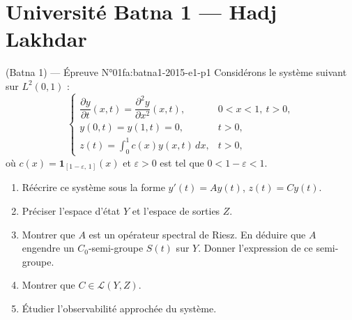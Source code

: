 \section{Université Batna 1 --- Hadj Lakhdar}
\begin{problem}{(Batna 1) — Épreuve N°01}{fa:batna1-2015-e1-p1}
Considérons le système suivant sur $L^2(0,1)$ :
$$\begin{cases}\dfrac{\partial y}{\partial t}(x,t)=\dfrac{\partial^2y}{\partial x^2}(x,t), & 0<x<1,\ t>0,\\[1ex] y(0,t)=y(1,t)=0, & t>0,\\[1ex] z(t)=\displaystyle\int_0^1c(x)y(x,t)\,dx, & t>0,\end{cases}$$
où $c(x)=\mathbf{1}_{[1-\varepsilon,\,1]}(x)$ et $\varepsilon>0$ est tel que $0<1-\varepsilon<1$.
\begin{enumerate}\item Réécrire ce système sous la forme $y'(t)=Ay(t)$, $z(t)=Cy(t)$.\item Préciser l'espace d'état $Y$ et l'espace de sorties $Z$.\item Montrer que $A$ est un opérateur spectral de Riesz. En déduire que $A$ engendre un $C_0$-semi-groupe $S(t)$ sur $Y$. Donner l'expression de ce semi-groupe.\item Montrer que $C\in\mathcal{L}(Y,Z)$.\item Étudier l'observabilité approchée du système.\end{enumerate}
\end{problem}
\newpage
